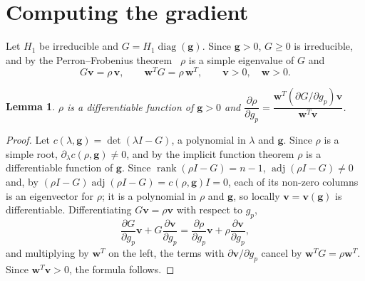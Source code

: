 \documentclass[11pt]{article}
\theoremstyle{plain}
\newtheorem{lemma}[theorem]{Lemma}
\theoremstyle{remark}
\numberwithin{equation}{section}
\begin{document}

\section{Computing the gradient}\label{sec-gradient}

Let $H_1$ be irreducible and $G=H_1\operatorname{diag}(\bm g)$. Since $\bm g>0$,
$G\ge 0$ is irreducible, and by the Perron--Frobenius
theorem~\cite[Theorem~8.4.4]{1985Horn_Johnson} $\rho$ is a simple eigenvalue of $G$ and
\begin{equation}\label{perron}
G\bm v=\rho\,\bm v,\qquad \bm w^TG=\rho\,\bm w^T,\qquad \bm v>0,\quad\bm w>0 .
\end{equation}

\begin{lemma}\label{simple-derivative}
$\rho$ is a differentiable function of $\bm g>0$ and
$\dfrac{\partial\rho}{\partial g_p}=\dfrac{\bm w^T\left(\partial G/\partial g_p\right)\bm v}{\bm w^T\bm v}$.
\end{lemma}
\begin{proof}
Let $c(\lambda,\bm g)=\det(\lambda I-G)$, a polynomial in $\lambda$ and $\bm g$.
Since $\rho$ is a simple root, $\partial_\lambda c(\rho,\bm g)\ne 0$, and by the
implicit function theorem $\rho$ is a differentiable function of $\bm g$.
Since $\operatorname{rank}(\rho I-G)=n-1$, $\operatorname{adj}(\rho I-G)\ne 0$
and, by $(\rho I-G)\operatorname{adj}(\rho I-G)=c(\rho,\bm g)I=0$, each of its
non-zero columns is an eigenvector for $\rho$; it is a polynomial in $\rho$ and
$\bm g$, so locally $\bm v=\bm v(\bm g)$ is differentiable. Differentiating
$G\bm v=\rho\bm v$ with respect to $g_p$,
\begin{equation*}
\frac{\partial G}{\partial g_p}\bm v+G\frac{\partial\bm v}{\partial g_p}
=\frac{\partial\rho}{\partial g_p}\bm v+\rho\frac{\partial\bm v}{\partial g_p},
\end{equation*}
and multiplying by $\bm w^T$ on the left, the terms with $\partial\bm v/\partial g_p$
cancel by $\bm w^TG=\rho\bm w^T$. Since $\bm w^T\bm v>0$, the formula follows.
\end{proof}
\end{document}
